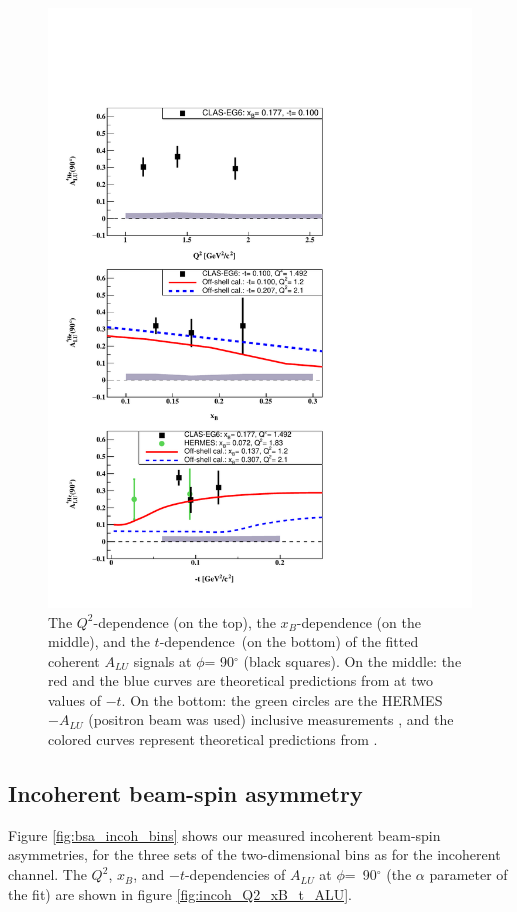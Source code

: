 \begin{figure}[tpb]
\centering
\includegraphics[scale=0.9]{fig_Dec2016/Coherent_ALU_phi_90.pdf}
   \caption{The $Q^{2}$-dependence (on the top), the $x_{B}$-dependence (on the 
      middle), and the $t$-dependence~(on the bottom) of the fitted coherent 
      $A_{LU}$ signals at $\phi$= 90$^{\circ}$ (black squares). On the middle: 
      the red and the blue curves are theoretical predictions from 
      \cite{simonetta_2} at two values of $-t$. On the bottom: the green 
      circles are the HERMES $-A_{LU}$ (positron beam was used) inclusive 
      measurements \cite{HERMES_BSA}, and the colored curves represent 
      theoretical predictions from \cite{simonetta_2}.} 
      \label{fig:coh_Q2_xB_t_ALU}
\end{figure}


\subsection{Incoherent beam-spin asymmetry}
Figure \ref{fig:bsa_incoh_bins} shows our measured incoherent beam-spin 
asymmetries, for the three sets of the two-dimensional bins as for the 
incoherent channel. The $Q^2$, $x_{B}$, and $-t$-dependencies of $A_{LU}$ at 
$\phi$=~90$^{\circ}$ (the $\alpha$ parameter of the fit) are shown in figure 
\ref{fig:incoh_Q2_xB_t_ALU}.

